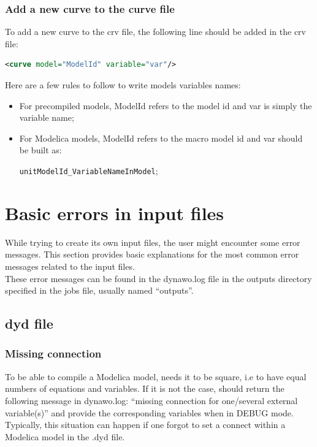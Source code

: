 \documentclass[a4paper, 12pt]{report}
\begin{document}
\subsubsection{Add a new curve to the curve file}

To add a new curve to the crv file, the following line should be added in the crv file:
\begin{lstlisting}[language=XML,numbers=none]
<curve model="ModelId" variable="var"/>
\end{lstlisting}

Here are a few rules to follow to write models variables names:
\begin{itemize}
\item For precompiled models, ModelId refers to the model id and var is simply the variable name;
\item For Modelica models, ModelId refers to the macro model id and var should be built as:

\verb|unitModelId_VariableNameInModel|;
\end{itemize}

\section{Basic errors in input files}

While trying to create its own input files, the user might encounter some error messages. This section provides basic explanations for the most common error messages related to the input files. \\

These error messages can be found in the dynawo.log file in the outputs directory specified in the jobs file, usually named ``outputs''.

\subsection{dyd file}

\subsubsection{Missing connection}

To be able to compile a Modelica model, \Dynawo needs it to be square, i.e to have equal numbers of equations and variables. If it is not the case, \Dynawo should return the following message in dynawo.log: ``missing connection for one/several external variable(s)'' and provide the corresponding variables when in DEBUG mode. Typically, this situation can happen if one forgot to set a connect within a Modelica model in the .dyd file. \\
\end{document}

